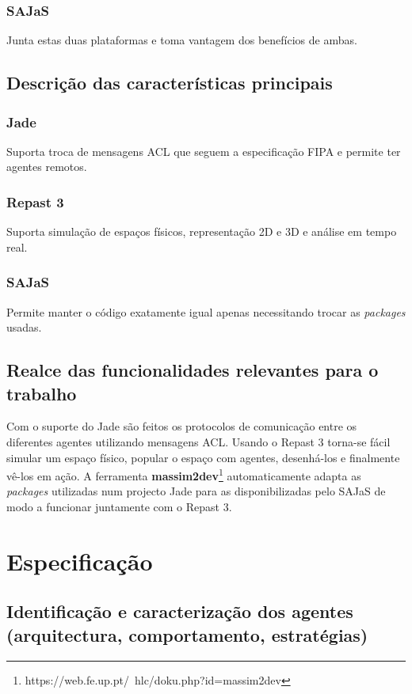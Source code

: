 \documentclass[12pt]{report}
\begin{document}
  \subsection{SAJaS}
  Junta estas duas plataformas e toma vantagem dos benefícios de ambas.

\section{Descrição das características principais}

  \subsection{Jade}
  Suporta troca de mensagens ACL que seguem a especificação FIPA e permite ter agentes remotos.
  
  \subsection{Repast 3}
  Suporta simulação de espaços físicos, representação 2D e 3D e análise em tempo real.

  \subsection{SAJaS}
  Permite manter o código exatamente igual apenas necessitando trocar as \emph{packages} usadas.

\section{Realce das funcionalidades relevantes para o trabalho}

Com o suporte do Jade são feitos os protocolos de comunicação entre os diferentes agentes utilizando mensagens ACL. Usando o Repast 3 torna-se
fácil simular um espaço físico, popular o espaço com agentes, desenhá-los e finalmente vê-los em ação.
A ferramenta \textbf{massim2dev}\footnote{https://web.fe.up.pt/~hlc/doku.php?id=massim2dev} automaticamente adapta as \textit{packages} utilizadas num
projecto Jade para as disponibilizadas pelo SAJaS de modo a funcionar juntamente com o Repast 3.


\chapter{Especificação}
\section{Identificação e caracterização dos agentes (arquitectura, comportamento, estratégias)}
\end{document}
